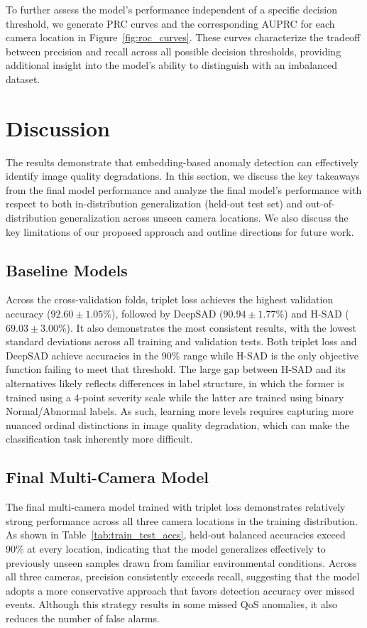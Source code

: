 \documentclass{article}
\begin{document}
To further assess the model's performance independent of a specific decision threshold, we generate \ac{PRC} curves and the corresponding \ac{AUPRC} for each camera location in Figure~\ref{fig:roc_curves}. These curves characterize the tradeoff between precision and recall across all possible decision thresholds, providing additional insight into the model's ability to distinguish with an imbalanced dataset. 

\section{Discussion}

The results demonstrate that embedding-based anomaly detection can effectively identify image quality degradations. In this section, we discuss the key takeaways from the final model performance and analyze the final model's performance with respect to both in-distribution generalization (held-out test set) and out-of-distribution generalization across unseen camera locations. We also discuss the key limitations of our proposed approach and outline directions for future work. 

\subsection{Baseline Models}
Across the cross-validation folds, triplet loss achieves the highest validation accuracy ($92.60 \pm 1.05\%$), followed by \ac{DeepSAD} ($90.94 \pm 1.77\%$) and \ac{H-SAD} ($69.03 \pm 3.00\%$). It also demonstrates the most consistent results, with the lowest standard deviations across all training and validation tests. Both triplet loss and \ac{DeepSAD} achieve accuracies in the $90\%$ range while \ac{H-SAD} is the only objective function failing to meet that threshold. The large gap between \ac{H-SAD} and its alternatives likely reflects differences in label structure, in which the former is trained using a 4-point severity scale while the latter are trained using binary Normal/Abnormal labels. As such, learning more levels requires capturing more nuanced ordinal distinctions in image quality degradation, which can make the classification task inherently more difficult. 

\subsection{Final Multi-Camera Model}
The final multi-camera model trained with triplet loss demonstrates relatively strong performance across all three camera locations in the training distribution. As shown in Table~\ref{tab:train_test_accs}, held-out balanced accuracies exceed 90\% at every location, indicating that the model generalizes effectively to previously unseen samples drawn from familiar environmental conditions. Across all three cameras, precision consistently exceeds recall, suggesting that the model adopts a more conservative approach that favors detection accuracy over missed events. Although this strategy results in some missed \ac{QoS} anomalies, it also reduces the number of false alarms. 
\end{document}
